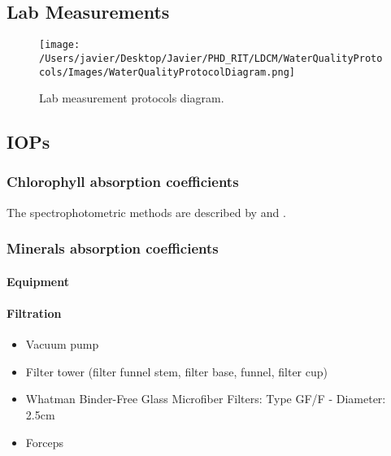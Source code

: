 \begin{appendices}
\chapter{Lab Measurements}
\label{ch:labmea} 


\begin{figure}[htb]
\centering
    \texttt{[image: /Users/javier/Desktop/Javier/PHD\_RIT/LDCM/WaterQualityProtocols/Images/WaterQualityProtocolDiagram.png]}%
    \vspace{0.5cm}
   \caption[]{\label{fig:ProtocolsDiagram} Lab measurement protocols diagram.}
\end{figure}

\section{IOPs}
\subsection{Chlorophyll absorption coefficients}
The spectrophotometric methods are described by \cite{Mitchell2002} and \cite{Cleveland1993}.
\subsection{Minerals absorption coefficients}

\subsubsection{Equipment}
\subsubsection*{Filtration}
\begin{itemize}
  \item Vacuum pump
  \item Filter tower (filter funnel stem, filter base, funnel, filter cup)
  \item Whatman Binder-Free Glass Microfiber Filters: Type GF/F - Diameter: 2.5cm
  \item Forceps
\end{itemize}

\end{appendices}

